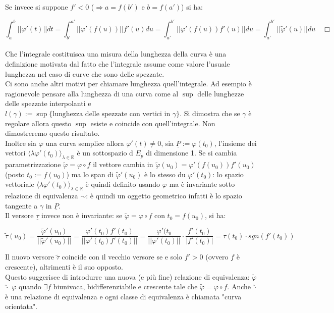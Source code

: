 \documentclass[a4paper,11pt,titlepage]{book}
\begin{document}
Se invece si suppone $f'<0$ ($\Rightarrow a=f(b')$ e $b=f(a')$) si ha:

$$\int_a^b||\varphi'(t)||dt=\int_{b'}^{a'} ||\varphi'(f(u))||f'(u)du=\int_{a'}^{b'} ||\varphi'(f(u))f'(u)||du=\int_{a'}^{b'}||\tilde{\varphi}'(u)||du\quad \Box$$\\

Che l'integrale costituisca una misura della lunghezza della curva è una definizione motivata dal fatto che l'integrale assume come valore l'usuale lunghezza nel caso di curve che sono delle spezzate.\\

Ci sono anche altri motivi per chiamare lunghezza quell'integrale. Ad esempio è ragionevole pensare alla lunghezza di una curva come al $\sup$ delle lunghezze delle spezzate interpolanti e  $l(\gamma):=\sup\{ \mbox{lunghezza delle spezzate con vertici in }\gamma \}$. Si dimostra che se $\gamma$ è regolare allora questo $\sup$ esiste e coincide con quell'integrale. Non dimostreremo questo risultato.\\

Inoltre sia $\varphi$ una curva semplice allora $\varphi'(t)\ne 0$, sia $\underline{P}:=\varphi(t_0)$, l'insieme dei vettori $\langle \lambda \varphi'(t_0)\rangle_{\lambda\in\mathbb{R}}$ è un sottospazio d $E_p$ di dimensione 1. Se si cambia parametrizzazione $\tilde{\varphi}=\varphi\circ f$ il vettore cambia in $\tilde{\varphi}(u_0)=\varphi'(f(u_0))f'(u_0)$ (posto $t_0:=f(u_0)$) ma lo span di $\tilde{\varphi}'(u_0)$ è lo stesso du $\varphi'(t_0)$: lo spazio vettoriale $\langle \lambda \varphi'(t_0)\rangle_{\lambda\in\mathbb{R}}$ è quindi definito usando $\varphi$ ma è invariante sotto relazione di equivalenza $\sim$: è quindi un oggetto geometrico infatti è lo spazio tangente a $\gamma$ in $\underline{P}$.\\

Il versore $\underline\tau$ invece non è invariante: se $\tilde{\varphi}=\varphi\circ f$ con $t_0=f(u_0)$, si ha:

$$\tilde{\tau}(u_0)=\frac{\tilde{\varphi}'(u_0)}{||\tilde{\varphi}'(u_0)||}=\frac{\varphi'(t_0)f'(t_0)}{||\varphi'(t_0)f'(t_0)||}=\frac{\varphi'(t_0}{||\varphi'(t_0)||}\cdot\frac{f'(t_0)}{|f'(t_0)|}=\tau{(t_0)}\cdot sgn(f'(t_0))$$

Il nuovo versore $\tilde{\tau}$ coincide con il vecchio versore se e solo $f'>0$ (ovvero $f$ è  crescente), altrimenti è il suo opposto.\\

Questo suggerisce di introdurre una nuova (e più fine) relazione di equivalenza: $\tilde{\varphi}$ $\utilde\cdot$ $\varphi$ quando $\exists f$ biunivoca, bidifferenziabile e crescente tale che $\tilde{\varphi}=\varphi\circ f$. Anche $\utilde{\cdot}$ è una relazione di equivalenza e ogni classe di equivalenza è chiamata "curva orientata".\\
\end{document}
